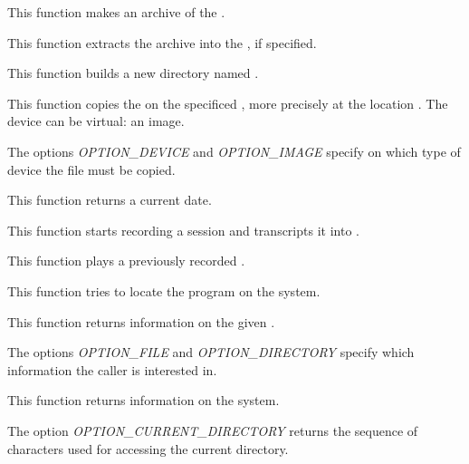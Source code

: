          {
	   This function makes an archive  of the
	   .
	 }

         {
	   This function extracts the archive  into the
	   , if specified.
	 }

         {
	   This function builds a new directory named .
	 }

         {
	   This function copies the  on the specificed
	   , more precisely at the location .
	   The device can be virtual: an image.

	   \-

	   The options \textit{OPTION\_DEVICE} and \textit{OPTION\_IMAGE}
	   specify on which type of device the file must be copied.
	 }

         {
	   This function returns a current date.
	 }

         {
	   This function starts recording a session and transcripts it
           into .
	 }

         {
	   This function plays a previously recorded .
	 }

         {
	   This function tries to locate the program 
	   on the system.
	 }

         {
	   This function returns information on the given .

	   \-

	   The options \textit{OPTION\_FILE} and \textit{OPTION\_DIRECTORY}
	   specify which information the caller is interested in.
	 }

         {
	   This function returns information on the system.

	   \-

	   The option \textit{OPTION\_CURRENT\_DIRECTORY} returns the
           sequence of characters used for accessing the current directory.
	 }
